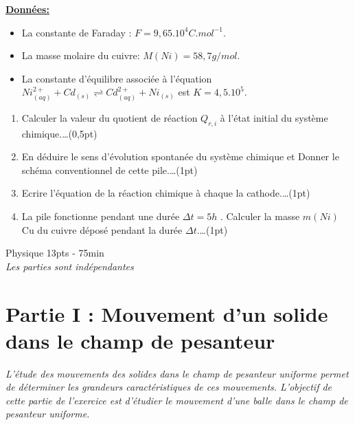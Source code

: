 \documentclass[12pt]{article}
\begin{document}
\textbf{\underline{Données:}}
\begin{itemize}
  \item La constante de Faraday : $F=9,65.10^{4} C.mol^{-1} $.
  \item La masse molaire du cuivre: $M(Ni) = 58,7 g/mol$.
  \item La constante d'équilibre associée à l'équation $Ni^{2+}_{(aq)} + Cd_{(s)} \rightleftharpoons	
 Cd^{2+}_{(aq)} + Ni_{(s)} $ est $K =4,5.10^{5}$.
\end{itemize}


\begin{enumerate}
  \item Calculer la valeur du quotient de réaction $Q_{r,i}$ à l’état initial du système chimique.\dots(0,5pt)
  \item  En déduire le sens d'évolution spontanée du système chimique et Donner le schéma conventionnel de cette pile.\dots(1pt)
  \item Ecrire l’équation de la réaction chimique à chaque la cathode.\dots(1pt)
  \item La pile fonctionne pendant une durée $\Delta{t} = 5h$ . Calculer la masse $m(Ni)$ Cu du cuivre déposé
    pendant la durée $\Delta{t}$.\dots(1pt)
\end{enumerate}

\begin{center}
\hrulefill
\Large{Physique 13pts - 75min}
\hrulefill\\
    \emph{Les parties sont indépendantes}
\end{center}

\section*{Partie I : Mouvement d’un solide dans le champ de pesanteur}

\emph{L’étude des mouvements des solides dans le champ de pesanteur uniforme permet de déterminer les
grandeurs caractéristiques de ces mouvements.
L’objectif de cette partie de l’exercice est d’étudier le mouvement d’une balle dans le champ de
pesanteur uniforme.}
\end{document}
